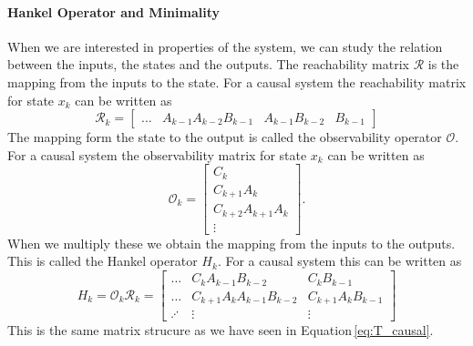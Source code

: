 \documentclass[doctype=mastersthesis,BCOR=15mm,biblatex]{ldvbook}%
\newcommand{\R}{\mathcal{R}} %
\newcommand{\Ob}{\mathcal{O}} %
\begin{document}
\paragraph{Hankel Operator and Minimality}
When we are interested in properties of the system, we can study the relation between the inputs, the states and the outputs. 
The reachability matrix $\R$ is the mapping from the inputs to the state. For a causal system the reachability matrix for state $x_k$ can be written as
\begin{equation}
	\R_k = \begin{bmatrix}
	 \dots & A_{k-1}A_{k-2}B_{k-1} &A_{k-1}B_{k-2} &B_{k-1}
	\end{bmatrix}
\end{equation}
The mapping form the state to the output is called the observability operator $\Ob$.
For a causal system the observability matrix for state $x_k$ can be written as
\begin{equation}
	\Ob_k = 
	\begin{bmatrix}
		C_k\\
		C_{k+1}A_k\\
		C_{k+2}A_{k+1}A_k\\
		\vdots
	\end{bmatrix}.
\end{equation}
When we multiply these we obtain the mapping from the inputs to the outputs. This is called the Hankel operator $H_k$.
For a causal system this can be written as
\begin{equation}\label{eq:H_def}
	H_k = \Ob_k \R_k = 
		\begin{bmatrix}
\dots   & C_{k}A_{k-1}B_{k-2} & C_{k}B_{k-1} \\
\dots   & C_{k+1}A_{k}A_{k-1}B_{k-2} & C_{k+1}A_{k}B_{k-1} \\
\iddots &\vdots &\vdots
\end{bmatrix}
\end{equation}
This is the same matrix strucure as we have seen in Equation\,\ref{eq:T_causal}.
\end{document}

